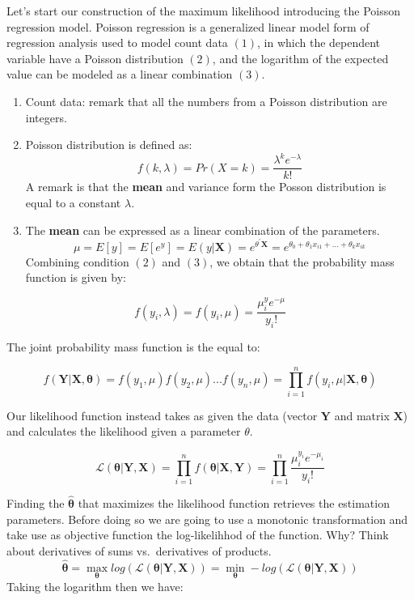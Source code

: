 \documentclass[]{book}
\providecommand{\tightlist}{%
  \setlength{\itemsep}{0pt}\setlength{\parskip}{0pt}}
\begin{document}
Let's start our construction of the maximum likelihood introducing the
Poisson regression model. Poisson regression is a generalized linear
model form of regression analysis used to model count data \((1)\), in
which the dependent variable have a Poisson distribution \((2)\), and
the logarithm of the expected value can be modeled as a linear
combination \((3)\).

\begin{enumerate}
\def\labelenumi{\arabic{enumi}.}
\tightlist
\item
  Count data: remark that all the numbers from a Poisson distribution
  are integers.
\item
  Poisson distribution is defined as:
  \[f(k,\lambda)=Pr(X=k)=\frac{\lambda^k e^{-\lambda}}{k!}\] A remark is
  that the \textbf{mean} and variance form the Posson distribution is
  equal to a constant \(\lambda\).
\item
  The \textbf{mean} can be expressed as a linear combination of the
  parameters.
  \[ \mu = E[y] = E[e^{y}] = E(y| \boldsymbol{X})=e^{\theta^{\prime} \boldsymbol{X}}=e^{\theta_0 + \theta_1 x_{i1}+ ... + \theta_k x_{ik} }\]
  Combining condition \((2)\) and \((3)\), we obtain that the
  probability mass function is given by:
\end{enumerate}

\[f(y_i,\lambda)=f(y_i,\mu)=\frac{\mu^y_i e^{-\mu}}{y_i!}\]

The joint probability mass function is the equal to:

\[f(\boldsymbol{Y}|\boldsymbol{X},\boldsymbol{\theta})=f(y_1,\mu) f(y_2,\mu)...f(y_n,\mu)    = \prod_{i=1}^n f(y_i,\mu|\boldsymbol{X},\boldsymbol{\theta})\]

Our likelihood function instead takes as given the data (vector
\(\boldsymbol{Y}\) and matrix \(\boldsymbol{X}\)) and calculates the
likelihood given a parameter \(\theta\).

\[\mathcal{L}(\boldsymbol{\theta} | \boldsymbol{Y},\boldsymbol{X}) = \prod_{i=1}^n f(\boldsymbol{\theta}|\boldsymbol{X},\boldsymbol{Y}) = \prod_{i=1}^n \frac{\mu_i^{y_i} e^{-\mu_i}}{y_i!}\]

Finding the \(\boldsymbol{\hat{\theta}}\) that maximizes the likelihood
function retrieves the estimation parameters. Before doing so we are
going to use a monotonic transformation and take use as objective
function the log-likelihhod of the function. Why? Think about
derivatives of sums vs.~derivatives of products.
\[\boldsymbol{\hat{\theta}} = \max_{\boldsymbol{\theta}} log( \mathcal{L}(\boldsymbol{\theta} | \boldsymbol{Y},\boldsymbol{X})) = \min _{\boldsymbol{\theta}} - log( \mathcal{L}(\boldsymbol{\theta} | \boldsymbol{Y},\boldsymbol{X})) \]
Taking the logarithm then we have:
\end{document}
